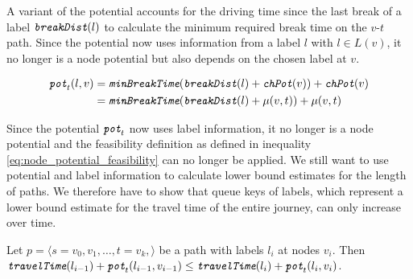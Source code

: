 A variant of the potential accounts for the driving time since the last break of a label $\texttt{\itshape breakDist}(l)$ to calculate the minimum required break time on the $v$-$t$ path. Since the potential now uses information from a label $l$ with $l \in L(v)$, it no longer is a node potential but also depends on the chosen label at $v$.

\begin{align}
	\texttt{\itshape pot}_t(l,v) & = \texttt{\itshape minBreakTime}(\texttt{\itshape breakDist}(l) + \texttt{\itshape chPot}(v)) +\texttt{\itshape chPot}(v) \\
	                          & = \texttt{\itshape minBreakTime}(\texttt{\itshape breakDist}(l) + \mu(v,t)) + \mu(v,t)
\end{align}

Since the potential $\texttt{\itshape pot}_t$ now uses label information, it no longer is a node potential and the feasibility definition as defined in inequality \ref{eq:node_potential_feasibility} can no longer be applied. We still want to use potential and label information to calculate lower bound estimates for the length of paths. We therefore have to show that queue keys of labels, which represent a lower bound estimate for the travel time of the entire journey, can only increase over time.

\begin{lemma}\label{lemma:pot_labels_get_larger}
	Let $p = \langle s=v_0,v_1,\ldots,t=v_k, \rangle$ be a path with labels $l_i$ at nodes $v_i$. Then $\texttt{\itshape travelTime}(l_{i-1}) + \texttt{\itshape pot}_t(l_{i-1},v_{i-1}) \le \texttt{\itshape travelTime}(l_i) + \texttt{\itshape pot}_t(l_i,v_i)$.
\end{lemma}

